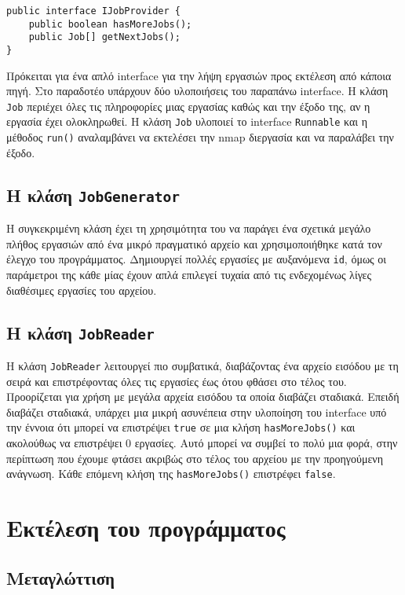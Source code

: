 \documentclass[a4paper,11pt]{article}
\begin{document}
\begin{sloppypar}
\begin{lstlisting}
public interface IJobProvider {
    public boolean hasMoreJobs();
    public Job[] getNextJobs();
}
\end{lstlisting}

Πρόκειται για ένα απλό interface για την λήψη εργασιών προς εκτέλεση από κάποια πηγή. Στο παραδοτέο υπάρχουν δύο υλοποιήσεις του παραπάνω interface. Η κλάση \texttt{Job} περιέχει όλες τις πληροφορίες μιας εργασίας καθώς και την έξοδο της, αν η εργασία έχει ολοκληρωθεί. Η κλάση \texttt{Job} υλοποιεί το interface \texttt{Runnable} και η μέθοδος \texttt{run()} αναλαμβάνει να εκτελέσει την nmap διεργασία και να παραλάβει την έξοδο.  

\subsection{H κλάση \texttt{JobGenerator}}

Η συγκεκριμένη κλάση έχει τη χρησιμότητα του να παράγει ένα σχετικά μεγάλο πλήθος εργασιών από ένα μικρό πραγματικό αρχείο και χρησιμοποιήθηκε κατά τον έλεγχο του προγράμματος. Δημιουργεί πολλές εργασίες με αυξανόμενα \texttt{id}, όμως οι παράμετροι της κάθε μίας έχουν απλά επιλεγεί τυχαία από τις ενδεχομένως λίγες διαθέσιμες εργασίες του αρχείου.

\subsection{H κλάση \texttt{JobReader}}

Η κλάση \texttt{JobReader} λειτουργεί πιο συμβατικά, διαβάζοντας ένα αρχείο εισόδου με τη σειρά και επιστρέφοντας όλες τις εργασίες έως ότου φθάσει στο τέλος του. Προορίζεται για χρήση με μεγάλα αρχεία εισόδου τα οποία διαβάζει σταδιακά. Επειδή διαβάζει σταδιακά, υπάρχει μια μικρή ασυνέπεια στην υλοποίηση του interface υπό την έννοια ότι μπορεί να επιστρέψει \texttt{true} σε μια κλήση \texttt{hasMoreJobs()} και ακολούθως να επιστρέψει 0 εργασίες. Αυτό μπορεί να συμβεί το πολύ μια φορά, στην περίπτωση που έχουμε φτάσει ακριβώς στο τέλος του αρχείου με την προηγούμενη ανάγνωση. Κάθε επόμενη κλήση της \texttt{hasMoreJobs()} επιστρέφει \texttt{false}.

\section{Εκτέλεση του προγράμματος}

\subsection{Μεταγλώττιση}


\end{sloppypar}
\end{document}
